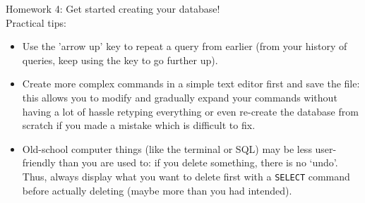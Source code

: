 \begin{frame}[standout]
    \alert{Homework 4: } Get started creating your database! \\[0.5em]
    \small Practical tips:
    {\footnotesize 
    \begin{itemize}
        \item Use the 'arrow up' key to repeat a query from earlier (from your history of queries, keep using the key to go further up).
        \item Create more complex commands in a simple text editor first and save the file: this allows you to modify and gradually expand your commands without having a lot of hassle retyping everything or even re-create the database from scratch if you made a mistake which is difficult to fix.
        \item Old-school computer things (like the terminal or SQL) may be less user-friendly than you are used to: if you delete something, there is no `undo'. Thus, always display what you want to delete first with a \texttt{SELECT} command before actually deleting (maybe more than you had intended). 
\end{itemize}
    }
\end{frame}

